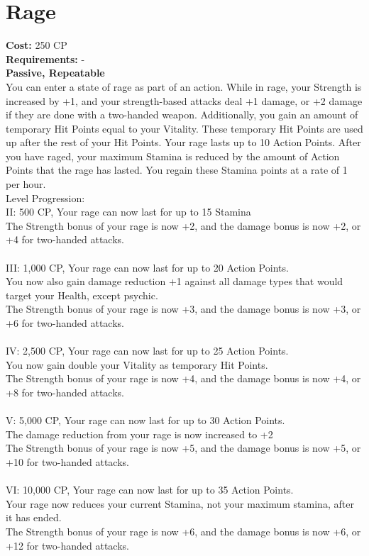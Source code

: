 \section{Rage}\label{perk:rage}
\textbf{Cost:} 250 CP\\
\textbf{Requirements:} -\\
\textbf{Passive, Repeatable}\\
You can enter a state of rage as part of an action.
While in rage, your Strength is increased by +1, and your strength-based attacks deal +1 damage, or +2 damage if they are done with a two-handed weapon.
Additionally, you gain an amount of temporary Hit Points equal to your Vitality.
These temporary Hit Points are used up after the rest of your Hit Points.
Your rage lasts up to 10 Action Points.
After you have raged, your maximum Stamina is reduced by the amount of Action Points that the rage has lasted.
You regain these Stamina points at a rate of 1 per hour.
\\
Level Progression:\\
II: 500 CP, Your rage can now last for up to 15 Stamina\\
The Strength bonus of your rage is now +2, and the damage bonus is now +2, or +4 for two-handed attacks.\\
\\
III: 1,000 CP, Your rage can now last for up to 20 Action Points.\\
You now also gain damage reduction +1 against all damage types that would target your Health, except psychic.\\
The Strength bonus of your rage is now +3, and the damage bonus is now +3, or +6 for two-handed attacks.\\
\\
IV: 2,500 CP, Your rage can now last for up to 25 Action Points.\\
You now gain double your Vitality as temporary Hit Points.\\
The Strength bonus of your rage is now +4, and the damage bonus is now +4, or +8 for two-handed attacks.\\
\\
V: 5,000 CP, Your rage can now last for up to 30 Action Points.\\
The damage reduction from your rage is now increased to +2\\
The Strength bonus of your rage is now +5, and the damage bonus is now +5, or +10 for two-handed attacks.\\
\\
VI: 10,000 CP, Your rage can now last for up to 35 Action Points.\\
Your rage now reduces your current Stamina, not your maximum stamina, after it has ended.\\
The Strength bonus of your rage is now +6, and the damage bonus is now +6, or +12 for two-handed attacks.\\
\\